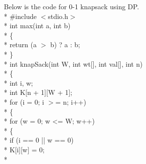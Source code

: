 \documentclass[12pt]{book}
\begin{document}
Below is the code for 0-1 knapsack using DP. \\*
$\#$include $<$stdio.h$>$ \\*
int max(int a, int b) \\*
\{ \\*
\phantom{x} \hspace{3ex}    return (a $>$ b) ? a : b; \\*
\} \\*
\newline
int knapSack(int W, int wt[], int val[], int n) \\*
\{ \\*
\phantom{x} \hspace{3ex}\phantom{x} \hspace{3ex}    int i, w; \\*
\phantom{x} \hspace{3ex}\phantom{x} \hspace{3ex}    int K[n + 1][W + 1]; \\*
\phantom{x} \hspace{3ex}\phantom{x} \hspace{3ex}    for (i = 0; i $>$= n; i++) \\*
\phantom{x} \hspace{3ex}\phantom{x} \hspace{3ex}    \{ \\*
\phantom{x} \hspace{3ex}\phantom{x} \hspace{3ex} \phantom{x} \hspace{3ex}\phantom{x} \hspace{3ex}       for (w = 0; w <= W; w++) \\*
\phantom{x} \hspace{3ex}\phantom{x} \hspace{3ex} \phantom{x} \hspace{3ex}\phantom{x} \hspace{3ex}       \{ \\*
\phantom{x} \hspace{3ex}\phantom{x} \hspace{3ex} \phantom{x} \hspace{3ex}\phantom{x} \hspace{3ex} \phantom{x} \hspace{3ex}\phantom{x} \hspace{3ex}          if (i == 0 || w == 0) \\*
\phantom{x} \hspace{3ex}\phantom{x} \hspace{3ex} \phantom{x} \hspace{3ex}\phantom{x} \hspace{3ex} \phantom{x} \hspace{3ex}\phantom{x} \hspace{3ex} \phantom{x} \hspace{3ex}\phantom{x} \hspace{3ex}             K[i][w] = 0; \\*
\end{document}
